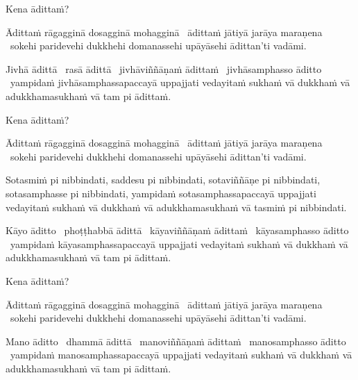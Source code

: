 Kena ādittaṁ?

\begin{pali-hang}
Ādittaṁ rāgagginā dosagginā mohagginā \breathmark\ ādittaṁ jātiyā jarāya maraṇena \breathmark\ sokehi paridevehi dukkhehi domanassehi upāyāsehi ādittan'ti vadāmi.
\end{pali-hang}

\begin{pali-hang}
Jivhā ādittā \breathmark\ rasā ādittā \breathmark\ jivhāviññāṇaṁ ādittaṁ \breathmark\ jivhāsamphasso āditto \breathmark\ yampidaṁ jivhāsamphassapaccayā uppajjati vedayitaṁ sukhaṁ vā dukkhaṁ vā adukkhamasukhaṁ vā tam pi ādittaṁ.
\end{pali-hang}

Kena ādittaṁ?

\begin{pali-hang}
Ādittaṁ rāgagginā dosagginā mohagginā \breathmark\ ādittaṁ jātiyā jarāya maraṇena \breathmark\ sokehi paridevehi dukkhehi domanassehi upāyāsehi ādittan'ti vadāmi.
\end{pali-hang}

\begin{pali-hang}
Sotasmiṁ pi nibbindati, saddesu pi nibbindati, sotaviññāṇe pi
nibbindati, sotasamphasse pi nibbindati, yampidaṁ sotasamphassapaccayā
uppajjati vedayitaṁ sukhaṁ vā dukkhaṁ vā adukkhamasukhaṁ vā tasmiṁ pi
nibbindati.
\end{pali-hang}

\begin{pali-hang}
Kāyo āditto \breathmark\ phoṭṭhabbā ādittā \breathmark\ kāyaviññāṇaṁ ādittaṁ \breathmark\ kāyasamphasso āditto \breathmark\ yampidaṁ kāyasamphassapaccayā uppajjati vedayitaṁ sukhaṁ vā dukkhaṁ vā adukkhamasukhaṁ vā tam pi ādittaṁ.
\end{pali-hang}

Kena ādittaṁ?

\begin{pali-hang}
Ādittaṁ rāgagginā dosagginā mohagginā \breathmark\ ādittaṁ jātiyā jarāya maraṇena \breathmark\ sokehi paridevehi dukkhehi domanassehi upāyāsehi ādittan'ti vadāmi.
\end{pali-hang}

\begin{pali-hang}
Mano āditto \breathmark\ dhammā ādittā \breathmark\ manoviññāṇaṁ ādittaṁ \breathmark\ manosamphasso āditto \breathmark\ yampidaṁ manosamphassapaccayā uppajjati vedayitaṁ sukhaṁ vā dukkhaṁ vā adukkhamasukhaṁ vā tam pi ādittaṁ.
\end{pali-hang}

